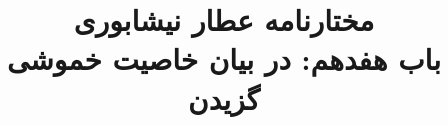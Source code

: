 \documentclass[14pt,b5paper]{article}
\begin{document}
\title{\Huge مختارنامه عطار نیشابوری \\
باب هفدهم: در بیان خاصیت خموشی گزیدن}
\author{ }
\date{ }
\maketitle
\newpage
\tableofcontents
\newpage

\newpage

\newpage

\newpage

\newpage

\newpage

\newpage

\newpage

\newpage

\newpage

\newpage

\newpage

\newpage

\newpage

\newpage

\newpage

\newpage

\newpage

\newpage

\newpage

\newpage

\newpage

\newpage

\newpage

\newpage

\newpage

\newpage
\end{document}
